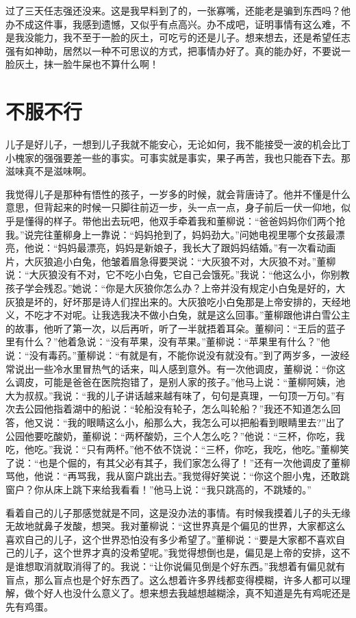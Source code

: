 \documentclass[12pt,oneside]{book}
\begin{document}
过了三天任志强还没来。这是我早料到了的，一张寡嘴，还能老是骗到东西吗？他办不成这件事，我感到遗憾，又似乎有点高兴。办不成吧，证明事情有这么难，不是我没能力，我不至于一脸的灰土，可吃亏的还是儿子。想来想去，还是希望任志强有如神助，居然以一种不可思议的方式，把事情办好了。真的能办好，不要说一脸灰土，抹一脸牛屎也不算什么啊！


\chapter{不服不行}
儿子是好儿子，一想到儿子我就不能安心，无论如何，我不能接受一波的机会比丁小槐家的强强要差一些的事实。可事实就是事实，果子再苦，我也只能吞下去。那滋味真不是滋味啊。

我觉得儿子是那种有悟性的孩子，一岁多的时候，就会背唐诗了。他并不懂是什么意思，但背起来的时候一只脚往前迈一步，头一点一点，身子前后一伏一仰地，似乎是懂得的样子。带他出去玩吧，他双手牵着我和董柳说：``爸爸妈妈你们两个抢我。''说完往董柳身上一靠说：``妈妈抢到了，妈妈劲大。''问她电视里哪个女孩最漂亮，他说：``妈妈最漂亮，妈妈是新娘子，我长大了跟妈妈结婚。''有一次看动画片，大灰狼追小白兔，他皱着眉急得要哭说：``大灰狼不对，大灰狼不对。''董柳说：``大灰狼没有不对，它不吃小白兔，它自己会饿死。''我说：``他这么小，你别教孩子学会残忍。''她说：``你是大灰狼你怎么办？上帝并没有规定小白兔是好的，大灰狼是坏的，好坏那是诗人们捏出来的。大灰狼吃小白兔那是上帝安排的，天经地义，不吃才不对呢。让我选我决不做小白兔，就是这么回事。''董柳跟他讲白雪公主的故事，他听了第一次，以后再听，听了一半就捂着耳朵。董柳问：``王后的蓝子里有什么？''他着急说：``没有苹果，没有苹果。''董柳说：``苹果里有什么？''他说：``没有毒药。''董柳说：``有就是有，不能你说没有就没有。''到了两岁多，一波经常说出一些冷水里冒热气的话来，叫人感到意外。有一次他调皮，董柳说：``你这么调皮，可能是爸爸在医院抱错了，是别人家的孩子。''他马上说：``董柳阿姨，池大为叔叔。''我说：``我的儿子讲话越来越有味了，句句是真理，一句顶一万句。''有次去公园他指着湖中的船说：``轮船没有轮子，怎么叫轮船？''我还不知道怎么回答，他又说：``我的眼睛这么小，船那么大，我怎么可以把船看到眼睛里去?''出了公园他要吃酸奶，董柳说：``两杯酸奶，三个人怎么吃？''他说：``三杯，你吃，我吃，他吃。''我说：``只有两杯。''他不依不饶说：``三杯，你吃，我吃，他吃。''董柳笑了说：``也是个倔的，有其父必有其子，我们家怎么得了！''还有一次他调皮了董柳骂他，他说：``再骂我，我从窗户跳出去。''我觉得好笑说：``你这个胆小鬼，还敢跳窗户？你从床上跳下来给我看看！''他马上说：``我只跳高的，不跳矮的。''

看着自己的儿子那感觉就是不同，这是没办法的事情。有时候我摸着儿子的头无缘无故地就鼻子发酸，想哭。我对董柳说：``这世界真是个偏见的世界，大家都这么喜欢自己的儿子，这个世界恐怕没有多少希望了。''董柳说：``要是大家都不喜欢自己的儿子，这个世界才真的没希望呢。''我觉得想倒也是，偏见是上帝的安排，这不是谁想取消就取消得了的。我说：``让你说偏见倒是个好东西。''我想着有偏见就有盲点，那么盲点也是个好东西了。这么想着许多界线都变得模糊，许多人都可以理解，做个好人也没什么意义了。想来想去我越想越糊涂，真不知道是先有鸡呢还是先有鸡蛋。
\end{document}
